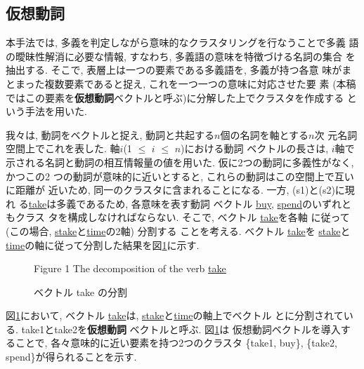 \subsection{仮想動詞}

本手法では, 多義を判定しながら意味的なクラスタリングを行なうことで多義
語の曖昧性解消に必要な情報, すなわち, 多義語の意味を特徴づける名詞の集合
を抽出する.  そこで, 表層上は一つの要素である多義語を, 多義が持つ各意
味がまとまった複数要素であると捉え, これを一つ一つの意味に対応させた要
素 (本稿ではこの要素を{\bf 仮想動詞}ベクトルと呼ぶ)に分解した上でクラスタを作成する
という手法を用いた.

我々は, 動詞をベクトルと捉え, 動詞と共起する$n$個の名詞を軸とする$n$次
元名詞空間上でこれを表した. 軸$i$(1 $\leq$ $i$ $\leq$ $n$)における動詞
ベクトルの長さは, $i$軸で示される名詞と動詞の相互情報量\hspace{-0.15mm}\cite{Church1990}\hspace{-0.1mm}の値を用いた. 仮に2つの動詞に多義性がなく, かつこの2
つの動詞が意味的に近いとすると, これらの動詞はこの空間上で互いに距離が
近いため, 同一のクラスタに含まれることになる. 一方, \hspace{-0.05mm}(s1)\hspace{-0.05mm}と\hspace{-0.05mm}(s2)\hspace{-0.05mm}に現れ
る\underline{take}は多義であるため, 各意味を表す動詞
ベクトル \underline{buy}, \underline{spend}のいずれともクラス
タを構成しなければならない.  そこで, ベクトル \underline{take}を各軸
に従って (この場合, \underline{stake}と\underline{time}の2軸) 分割する
ことを考える.  ベクトル \underline{take}を
\underline{stake}と\underline{time}の軸に従って分割した結果を図\ref{cluster1}に示す.

{
\begin{figure}[htbp]
\centerline{
}
\caption{ベクトル take の分割} \label{cluster1}
\begin{center}
\vspace*{-5mm}
Figure 1 The decomposition of the verb \underline{take} 
\end{center}
\end{figure}
}

\noindent
図\ref{cluster1}において, ベクトル \hspace{-0.2mm}\underline{take}は, \underline{stake}\hspace{-0.2mm}と\hspace{-0.2mm}\underline{time}の軸上でベクトル \hspace{-0.2mm}{\sf take1}\hspace{-0.3mm}と\hspace{-0.2mm}{\sf take2}に分割されている.  {\sf take1}と{\sf take2}を{\bf 仮想動詞}
ベクトルと呼ぶ.  図\ref{cluster1}は
仮想動詞ベクトルを導入することで, 各々意味的に近い要素を持つ2つのクラスタ 
\{{\sf take1}, buy\},
\{{\sf take2}, spend\}が得られることを示す.


